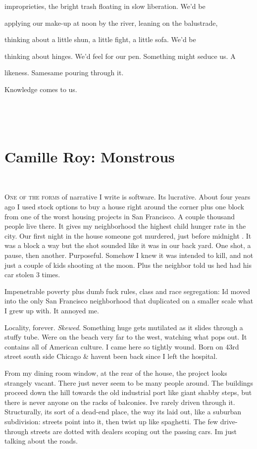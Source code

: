 \documentclass[
]{memoir}
\begin{document}
improprieties, the bright trash floating in slow liberation. We'd be

applying our make-up at noon by the river, leaning on the balustrade,

thinking about a little shun, a little fight, a little sofa. We'd be

thinking about hinges. We'd feel for our pen. Something might seduce us.
A

likeness. Samesame pouring through it.

Knowledge comes to us.

~

~

\hypertarget{camille-roy-monstrous}{%
\chapter{Camille Roy: Monstrous}\label{camille-roy-monstrous}}

~

\lettrine[lines=3, findent=0em, nindent=0.1em, lhang=0]{O}{ne of the forms}
of narrative I write is software. Its lucrative. About four years ago I
used stock options to buy a house right around the corner plus one block
from one of the worst housing projects in San Francisco. A couple
thousand people live there. It gives my neighborhood the highest child
hunger rate in the city. Our first night in the house someone got
murdered, just before midnight . It was a block a way but the shot
sounded like it was in our back yard. One shot, a pause, then another.
Purposeful. Somehow I knew it was intended to kill, and not just a
couple of kids shooting at the moon. Plus the neighbor told us hed had
his car stolen 3 times.

Impenetrable poverty plus dumb fuck rules, class and race segregation:
Id moved into the only San Francisco neighborhood that duplicated on a
smaller scale what I grew up with. It annoyed me.

Locality, forever. \emph{Skewed}. Something huge gets mutilated as it
slides through a stuffy tube. Were on the beach very far to the west,
watching what pops out. It contains all of American culture. I came here
so tightly wound. Born on 43rd street south side Chicago \& havent been
back since I left the hospital.

From my dining room window, at the rear of the house, the project looks
strangely vacant. There just never seem to be many people around. The
buildings proceed down the hill towards the old industrial port like
giant shabby steps, but there is never anyone on the racks of balconies.
Ive rarely driven through it. Structurally, its sort of a dead-end
place, the way its laid out, like a suburban subdivision: streets point
into it, then twist up like spaghetti. The few drive-through streets are
dotted with dealers scoping out the passing cars. Im just talking about
the roads.
\end{document}

